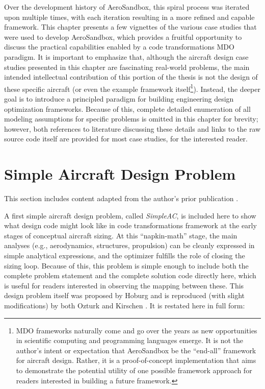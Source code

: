 Over the development history of AeroSandbox, this spiral process was iterated upon multiple times, with each iteration resulting in a more refined and capable framework. This chapter presents a few vignettes of the various case studies that were used to develop AeroSandbox, which provides a fruitful opportunity to discuss the practical capabilities enabled by a code transformations MDO paradigm. It is important to emphasize that, although the aircraft design case studies presented in this chapter are fascinating real-world problems, the main intended intellectual contribution of this portion of the thesis is not the design of these specific aircraft (or even the example framework itself\footnote{MDO frameworks naturally come and go over the years as new opportunities in scientific computing and programming languages emerge. It is not the author's intent or expectation that AeroSandbox be the ``end-all'' framework for aircraft design. Rather, it is a proof-of-concept implementation that aims to demonstrate the potential utility of one possible framework approach for readers interested in building a future framework.}). Instead, the deeper goal is to introduce a principled paradigm for building engineering design optimization frameworks. Because of this, complete detailed enumeration of all modeling assumptions for specific problems is omitted in this chapter for brevity; however, both references to literature discussing these details and links to the raw source code itself are provided for most case studies, for the interested reader.


\section{Simple Aircraft Design Problem}
\label{sec:simpleac}

\begin{attrib}
    This section includes content adapted from the author's prior publication \cite{sharpe_aerosandbox_2021}.
\end{attrib}

A first simple aircraft design problem, called \emph{SimpleAC}, is included here to show what design code might look like in code transformations framework at the early stages of conceptual aircraft sizing. At this ``napkin-math'' stage, the main analyses (e.g., aerodynamics, structures, propulsion) can be cleanly expressed in simple analytical expressions, and the optimizer fulfills the role of closing the sizing loop. Because of this, this problem is simple enough to include both the complete problem statement and the complete solution code directly here, which is useful for readers interested in observing the mapping between these. This design problem itself was proposed by Hoburg \cite{hoburg} and is reproduced (with slight modifications) by both Ozturk \cite{Ozturk2018} and Kirschen \cite{kirschen}. It is restated here in full form:

